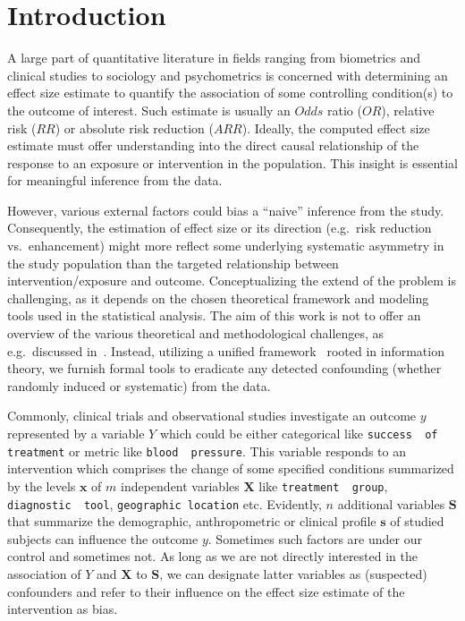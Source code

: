 \documentclass[10pt]{article}
\begin{document}
\section{Introduction}


A large part of quantitative  literature \cite{blettner1999traditional,valentine2013issues,mathur2019sensitivity,mathur2022methods} in fields ranging from biometrics and clinical studies to sociology and psychometrics is concerned with determining an effect size estimate to quantify the  association of some controlling condition(s) to the outcome of interest. 
Such estimate is usually an $Odds$ ratio ($OR$), relative risk ($RR$) or absolute risk reduction ($ARR$).
Ideally, the computed effect size estimate must offer understanding into the direct causal relationship of the response to an exposure or intervention in the population. This insight is essential for meaningful inference from the data.    

%
However, various external factors could bias a ``naive'' inference from the study. Consequently, the estimation of  effect size or its direction (e.g.\ risk reduction vs.\ enhancement) might more reflect
some underlying systematic asymmetry in the study population than the targeted relationship between intervention/exposure and outcome.
Conceptualizing the extend of the problem is challenging, as it depends on the chosen theoretical framework and modeling tools used in the statistical analysis. 
The aim of this work is not to offer an overview of the various theoretical and methodological challenges, as e.g.\ discussed in~\cite{cook2002experimental,christenfeld2004risk,brookhart2010confounding}. 
Instead, utilizing a unified framework~\cite{loukas2023demographic} rooted in information theory, we furnish formal tools to eradicate any detected confounding (whether randomly induced or systematic) from the data. 

%
Commonly, clinical trials and observational studies investigate an outcome $y$  represented by a variable $Y$ which could be either categorical like \texttt{success\,\,of\,\,treatment} or metric like \texttt{blood\,\,pressure}. This variable responds to an intervention 
which
comprises the change of some specified conditions summarized by the levels $\boldsymbol x$ of $m$ independent variables  $\boldsymbol X$ like \texttt{treatment\,\,group}, \texttt{diagnostic\,\,tool}, \texttt{geographic location} etc. 
Evidently, $n$
additional variables $\boldsymbol S$ that summarize the demographic, anthropometric or clinical profile $\boldsymbol s$ of studied subjects can influence the outcome $y$. Sometimes such factors are under our control and sometimes not. 
As long as we are not directly interested in the association of $Y$ and $\boldsymbol X$ to $\boldsymbol S$, we can designate  latter variables as (suspected) {confounders} and refer to their influence on the effect size estimate of the intervention as bias. 
\end{document}
